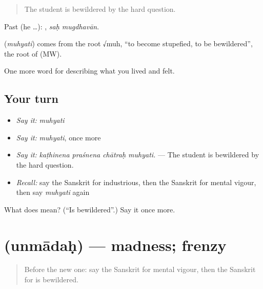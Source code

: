 \begin{quote}
The student is bewildered by the hard question.
\end{quote}

Past (he …):  , \emph{saḥ mugdhavān}.

\begin{cousinweb}
\textbf{} (\emph{muhyati}) comes from the root √muh, \textquotedblleft{}to become stupefied, to be bewildered\textquotedblright{}, the root of \textbf{} (MW).
\end{cousinweb}

\begin{grammarlens}[title={What you've built}]
One more word for describing what you lived and felt.
\end{grammarlens}

\subsection*{Your turn}
\begin{itemize}
\raggedright
  \item \emph{Say it:} \emph{muhyati}
  \item \emph{Say it:} \emph{muhyati}, once more
  \item \emph{Say it:} \emph{kaṭhinena praśnena chātraḥ muhyati.} — The student is bewildered by the hard question.
  \item \emph{Recall:} say the Sanskrit for industrious, then the Sanskrit for mental vigour, then say \emph{muhyati} again
\end{itemize}

\begin{tcolorbox}[breakable,colback=teal!4,colframe=teal!35!black,title={Before you move on}]
What does  mean? (\textquotedblleft{}Is bewildered\textquotedblright{}.) Say it once more.
\end{tcolorbox}
\section[\texorpdfstring{\sk{उन्मादः} (unmādaḥ)}{उन्मादः (unmādaḥ)}]{ (unmādaḥ) — madness; frenzy}

\label{lesson:SA-C466-unmadah}



\begin{quote}
Before the new one: say the Sanskrit for mental vigour, then the Sanskrit for is bewildered.
\end{quote}

